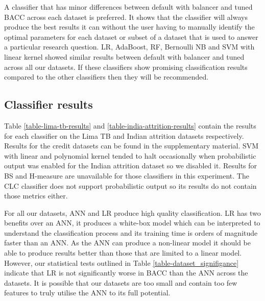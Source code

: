 \documentclass{sig-alternate-05-2015}
\begin{document}
	A classifier that has minor differences between default with balancer and tuned BACC across each dataset is preferred. It shows that the classifier will always produce the best results it can without the user having to manually identify the optimal parameters for each dataset or subset of a dataset that is used to answer a particular research question. LR, AdaBoost, RF, Bernoulli NB and SVM with linear kernel showed similar results between default with balancer and tuned across all our datasets. If these classifiers show promising classification results compared to the other classifiers then they will be recommended.

	\subsection{Classifier results}
	\label{classifier-results}
	Table \ref{table-lima-tb-results} and \ref{table-india-attrition-results} contain the results for each classifier on the Lima TB and Indian attrition datasets respectively. Results for the credit datasets can be found in the supplementary material. SVM with linear and polynomial kernel tended to halt occasionally when probabilistic output was enabled for the Indian attrition dataset so we disabled it. Results for BS and H-measure are unavailable for those classifiers in this experiment. The CLC classifier does not support probabilistic output so its results do not contain those metrics either.
	
	For all our datasets, ANN and LR produce high quality classification. LR has two benefits over an ANN, it produces a white-box model which can be interpreted to understand the classification process \cite{Dreiseitl2002352} and its training time is orders of magnitude faster than an ANN. As the ANN can produce a non-linear model it should be able to produce results better than those that are limited to a linear model. However, our statistical tests outlined in Table \ref{table-dataset_signifigance} indicate that LR is not significantly worse in BACC than the ANN across the datasets. It is possible that our datasets are too small and contain too few features to truly utilise the ANN to its full potential. 
	
\end{document}
